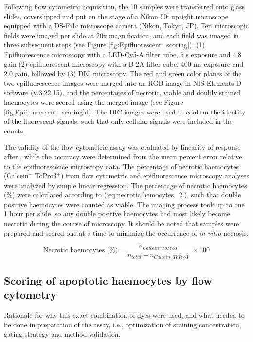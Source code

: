 Following flow cytometric acquisition, the 10 samples were transferred onto glass slides, coverslipped and put on the stage of a Nikon 90i upright microscope equipped with a DS-Fi1c microscope camera (Nikon, Tokyo, JP). Ten microscopic fields were imaged per slide at 20x magnification, and each field was imaged in three subsequent steps (see Figure \ref{fig:Epifluorescent_scoring}): (1) Epifluorescence microscopy with a LED-Cy5-A filter cube, 6 s exposure and 4.8 gain (2) epifluorescent microscopy with a B-2A filter cube, 400 ms exposure and 2.0 gain, followed by (3) DIC microscopy. The red and green color planes of the two epifluorescence images were merged into an RGB image in NIS Elements D software (v.3.22.15), and the percentages of necrotic, viable and doubly stained haemocytes were scored using the merged image (see Figure \ref{fig:Epifluorescent_scoring}d). The DIC images were used to confirm the identity of the fluorescent signals, such that only cellular signals were included in the counts.

The validity of the flow cytometric assay was evaluated by linearity of response after \cite{Ericson2021}, while the accuracy were determined from the mean percent error relative to the epifluorescence microscopy data. The percentage of necrotic haemocytes (Calcein$^{-}$ ToPro3$^{+}$) from flow cytometric and epifluorescence microscopy analyses were analyzed by simple linear regression. The percentage of necrotic haemocytes (\%) were calculated according to (\ref{eq:necrotic hemocytes_2}), such that double positive haemocytes were counted as viable. The imaging process took up to one 1 hour per slide, so any double positive haemocytes had most likely become necrotic during the course of microscopy. It should be noted that samples were prepared and scored one at a time to minimize the occurrence of \emph{in vitro} necrosis.

\begin{equation}
    \label{eq:necrotic hemocytes_2}
    \text{Necrotic haemocytes (\%)} = \dfrac{n_{Calcein^{-}ToPro3^{+}}}{n_{total} - n_{Calcein^{-}ToPro3^{-}}} \times 100
\end{equation}


\subsection{Scoring of apoptotic haemocytes by flow cytometry}
Rationale for why this exact combination of dyes were used, and what needed to be done in preparation of the assay, i.e., optimization of staining concentration, gating strategy and method validation.

